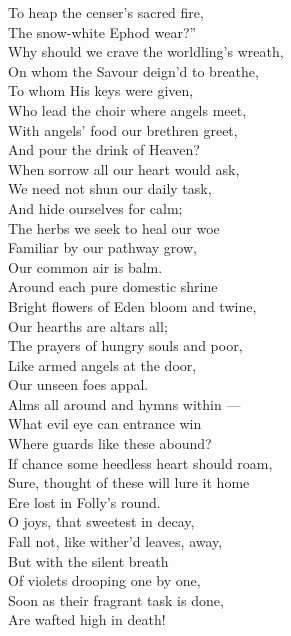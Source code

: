  To heap the censer’s sacred fire, \\
 The snow-white Ephod wear?” \\
  Why should we crave the worldling’s wreath, \\
 On whom the Savour deign’d to breathe, \\
 To whom His keys were given, \\
 Who lead the choir where angels meet, \\
 With angels’ food our brethren greet, \\
 And pour the drink of Heaven? \\
  When sorrow all our heart would ask, \\
 We need not shun our daily task, \\
 And hide ourselves for calm; \\
 The herbs we seek to heal our woe \\
 Familiar by our pathway grow, \\
 Our common air is balm. \\
  Around each pure domestic shrine \\
 Bright flowers of Eden bloom and twine, \\
 Our hearths are altars all; \\
 The prayers of hungry souls and poor, \\
 Like armed angels at the door, \\
 Our unseen foes appal. \\
  Alms all around and hymns within — \\
 What evil eye can entrance win \\
 Where guards like these abound? \\
 If chance some heedless heart should roam, \\
 Sure, thought of these will lure it home \\
 Ere lost in Folly’s round. \\
  O joys, that sweetest in decay, \\
 Fall not, like wither’d leaves, away, \\
 But with the silent breath \\
 Of violets drooping one by one, \\
 Soon as their fragrant task is done, \\
 Are wafted high in death!\\


